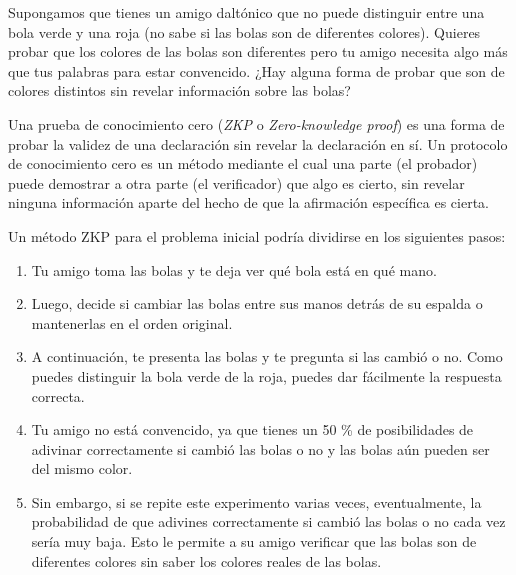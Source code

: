 Supongamos que tienes un amigo daltónico que no puede distinguir entre una bola verde y una roja (no sabe si las bolas son de diferentes colores). Quieres probar que los colores de las bolas son diferentes pero tu amigo necesita algo más que tus palabras para estar convencido. ¿Hay alguna forma de probar que son de colores distintos sin revelar información sobre las bolas?

Una prueba de conocimiento cero (\emph{ZKP} o \emph{Zero-knowledge proof}) es una forma de probar la validez de una declaración sin revelar la declaración en sí. Un protocolo de conocimiento cero es un método mediante el cual una parte (el probador) puede demostrar a otra parte (el verificador) que algo es cierto, sin revelar ninguna información aparte del hecho de que la afirmación específica es cierta.

Un método ZKP para el problema inicial podría dividirse en los siguientes pasos:
\begin{enumerate}
     \item Tu amigo toma las bolas y te deja ver qué bola está en qué mano.
     
     \item Luego, decide si cambiar las bolas entre sus manos detrás de su espalda o mantenerlas en el orden original.
     
     \item A continuación, te presenta las bolas y te pregunta si las cambió o no. Como puedes distinguir la bola verde de la roja, puedes dar fácilmente la respuesta correcta.
     
     \item Tu amigo no está convencido, ya que tienes un 50 \% de posibilidades de adivinar correctamente si cambió las bolas o no y las bolas aún pueden ser del mismo color.
     
     \item Sin embargo, si se repite este experimento varias veces, eventualmente, la probabilidad de que adivines correctamente si cambió las bolas o no cada vez sería muy baja. Esto le permite a su amigo verificar que las bolas son de diferentes colores sin saber los colores reales de las bolas.
\end{enumerate}

